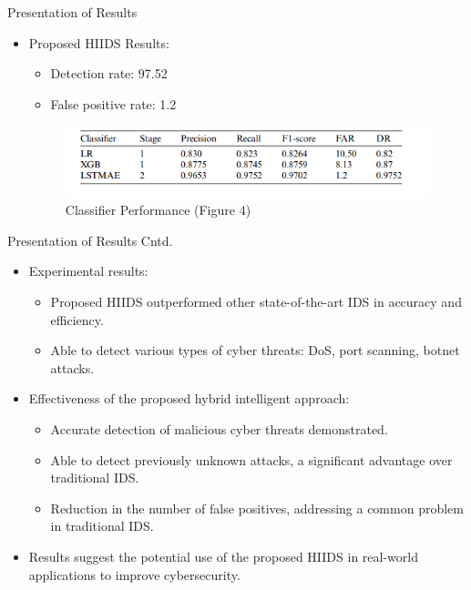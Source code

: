 \documentclass{beamer}
\begin{document}
\begin{frame}{Presentation of Results}


  \begin{itemize}
    \item Proposed HIIDS Results:
      \begin{itemize}
        \item Detection rate: 97.52%
        \item False positive rate: 1.2%
      \end{itemize}

  \begin{figure}
    \centering
    \includegraphics[width=1\textwidth]{Table 6.PNG}
    \caption{Classifier Performance (Figure 4)}
  \end{figure}
      

  \end{itemize}
\end{frame}


\begin{frame}{Presentation of Results Cntd.}


  \begin{itemize}
      
    \item Experimental results:
      \begin{itemize}
        \item Proposed HIIDS outperformed other state-of-the-art IDS in accuracy and efficiency.
        \item Able to detect various types of cyber threats: DoS, port scanning, botnet attacks.
      \end{itemize}
    \item Effectiveness of the proposed hybrid intelligent approach:
      \begin{itemize}
        \item Accurate detection of malicious cyber threats demonstrated.
        \item Able to detect previously unknown attacks, a significant advantage over traditional IDS.
        \item Reduction in the number of false positives, addressing a common problem in traditional IDS.
      \end{itemize}
    \item Results suggest the potential use of the proposed HIIDS in real-world applications to improve cybersecurity.
  \end{itemize}
\end{frame}
\end{document}
